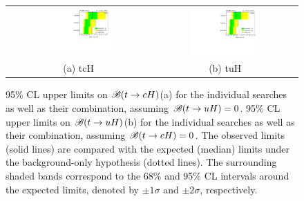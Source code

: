 \begin{figure}[h!]
\begin{center}
\begin{tabular}{@{}cc@{}}
\includegraphics[width=0.49\textwidth]{figures/tcH_Limits.pdf}&
\includegraphics[width=0.49\textwidth]{figures/tuH_Limits.pdf}\\
(a) tcH & (b) tuH \\
\end{tabular}
\caption{\small {95\% CL upper limits on $\mathscr{B}(t\to cH)$(a) for the individual searches as well as their
combination, assuming $\mathscr{B}(t\to uH)=0$. 95\% CL upper limits on $\mathscr{B}(t\to uH)$(b) for the individual searches as well as their
combination, assuming $\mathscr{B}(t\to cH)=0$. The observed limits (solid lines) are compared with the 
expected (median) limits under the background-only hypothesis (dotted lines). The surrounding shaded bands correspond to the 68\% and 95\% CL intervals around the expected limits, 
denoted by $\pm 1\sigma$ and $\pm 2\sigma$, respectively.
}}
\label{fig:limits_combo_1D_hc} 
\end{center}
\end{figure}


